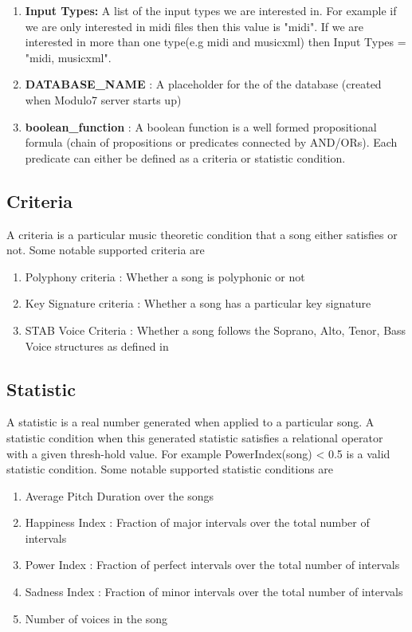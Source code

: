 \documentclass{article}
\begin{document}
\begin{enumerate}
\item \textbf{Input Types: } A list of the input types we are interested in. For example if we are only interested in midi files then this value is "midi". If we are interested in more than one type(e.g midi and musicxml) then Input Types = "midi, musicxml". 
\item \textbf{DATABASE\_NAME} : A placeholder for the of the database (created when Modulo7 server starts up)
\item \textbf{boolean\_function} : A boolean function is a well formed propositional formula (chain of propositions or predicates connected by AND/ORs). Each predicate can either be defined as a criteria or statistic condition.   
\end{enumerate}

\subsection{Criteria}

A criteria is a particular music theoretic condition that a song either satisfies or not. Some notable supported criteria are 

\begin{enumerate}
\item Polyphony criteria : Whether a song is polyphonic or not
\item Key Signature criteria : Whether a song has a particular key signature
\item STAB Voice Criteria : Whether a song follows the Soprano, Alto, Tenor, Bass Voice structures as defined in 
\end{enumerate}

\subsection{Statistic}

A statistic is a real number generated when applied to a particular song. A statistic condition when this generated statistic satisfies a relational operator with a given thresh-hold value. For example PowerIndex(song) < 0.5 is a valid statistic condition. Some notable supported statistic conditions are 

\begin{enumerate}
\item Average Pitch Duration over the songs
\item Happiness Index : Fraction of major intervals over the total number of intervals
\item Power Index : Fraction of perfect intervals over the total number of intervals
\item Sadness Index : Fraction of minor intervals over the total number of intervals
\item Number of voices in the song
\end{enumerate}
\end{document}
